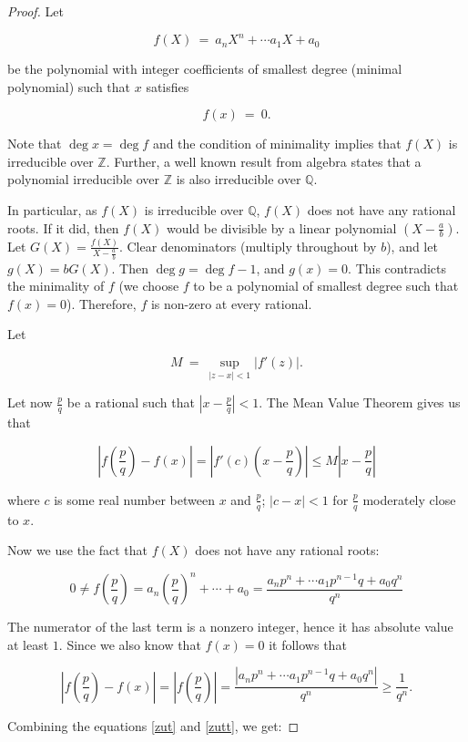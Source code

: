 \documentclass[12pt,letterpaper]{report}
\newcommand\be{\begin{equation}}
\newcommand\ee{\end{equation}}
\newcommand{\Z}{\ensuremath{\mathbb{Z}}}
\newcommand{\Q}{\mathbb{Q}}
\begin{document}
\begin{proof}
Let

\be f(X) \ = \ a_nX^n+\cdots a_1X+a_0 \ee

be the polynomial with integer coefficients of smallest degree
(minimal polynomial) such that $x$ satisfies

\be f(x) \ = \ 0. \ee

Note that $\deg x=\deg f$ and the condition of minimality implies
that $f(X)$ is irreducible over $\Z$. Further, a well known result
from algebra states that a polynomial irreducible over $\Z$ is
also irreducible over $\Q$.

In particular, as $f(X)$ is irreducible over $\Q$, $f(X)$ does not
have any rational roots. If it did, then $f(X)$ would be divisible
by a linear polynomial $(X - \frac{a}{b})$. Let $G(X) =
\frac{f(X)}{X - \frac{a}{b}}$. Clear denominators (multiply
throughout by $b$), and let $g(X) = bG(X)$. Then $\deg g = \deg f
- 1$, and $g(x) = 0$. This contradicts the minimality of $f$ (we
choose $f$ to be a polynomial of smallest degree such that $f(x) =
0$). Therefore, $f$ is non-zero at every rational.

Let

\be M \ = \ \displaystyle{\sup _{|z-x|<1}|f'(z)|}. \ee

Let now $\frac{p}{q}$ be a rational such that
$\left|x-\frac{p}{q}\right|<1$. The Mean Value Theorem gives us
that

\be \label{zut} \left|f\left(\frac{p}{q}\right)-f(x)\right|=
\left|f'(c)\left(x-\frac{p}{q}\right)\right|\leq
M\left|x-\frac{p}{q}\right| \ee

where $c$ is some real number between $x$ and $\frac{p}{q}$;
$|c-x|<1$ for $\frac{p}{q}$ moderately close to $x$.

Now we use the fact that $f(X)$ does not have any rational roots:

\be 0\neq f\left(\frac{p}{q}\right)=
a_n\left(\frac{p}{q}\right)^n+\cdots + a_0 =\frac{a_np^n+\cdots
a_1p^{n-1}q+a_0q^n}{q^n} \ee

The numerator of the last term is a nonzero integer, hence it has
absolute value at least $1$. Since we also know that $f(x)=0$ it
follows that

\be \label{zutt} \left|f\left(\frac{p}{q}\right)-f(x)\right|=
\left|f\left(\frac{p}{q}\right)\right| =\frac{\left|a_np^n+\cdots
a_1p^{n-1}q+a_0q^n\right|}{q^n} \geq \frac{1}{q^n}. \ee

Combining the equations \ref{zut} and  \ref{zutt}, we get:


\end{proof}
\end{document}
